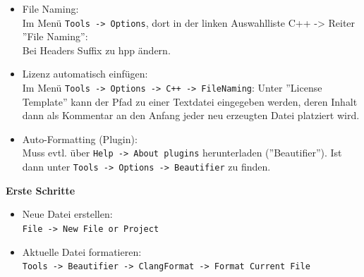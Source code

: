 \begin{itemize}
	\item File Naming:\\
  Im Menü \texttt{Tools -> Options}, dort in der linken Auswahlliste C++ ->
  Reiter ''File Naming'':\\ Bei Headers Suffix zu hpp ändern.

	\item Lizenz automatisch einfügen:\\

  Im Menü \texttt{Tools -> Options -> C++ -> FileNaming}: Unter ''License
  Template'' kann der Pfad zu einer Textdatei eingegeben werden, deren Inhalt
  dann als Kommentar an den Anfang jeder neu erzeugten Datei platziert wird.

	\item Auto-Formatting (Plugin):\\

  Muss evtl. über \texttt{Help -> About plugins} herunterladen (''Beautifier'').
  Ist dann unter \texttt{Tools -> Options -> Beautifier} zu finden.
  \end{itemize}
\textbf{Erste Schritte}\\
\begin{itemize}
	\item Neue Datei erstellen:\\
	\texttt{File -> New File or Project}
	\item Aktuelle Datei formatieren:\\
	\texttt{Tools -> Beautifier -> ClangFormat -> Format Current File}
\end{itemize}
